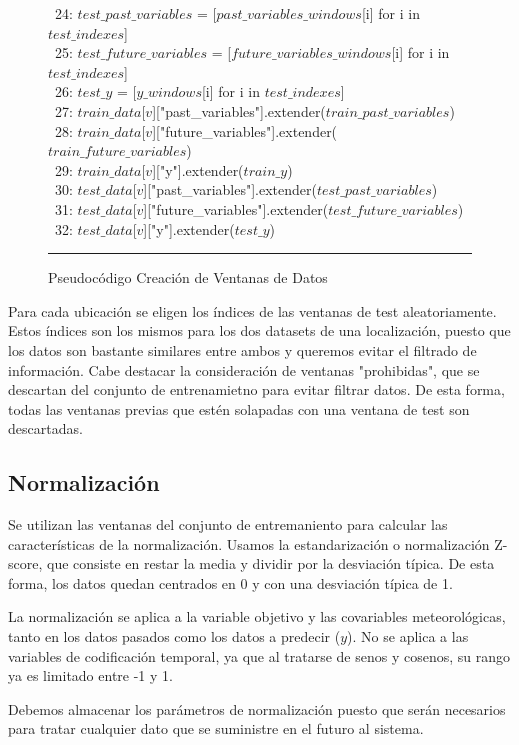 \begin{figure}[H]
{\begin{center}
\begin{tabbing}
\ 24: \> \> \> $test\_past\_variables$ = [$past\_variables\_windows$[i] for i in $test\_indexes$] \\
\ 25: \> \> \> $test\_future\_variables$ = [$future\_variables\_windows$[i] for i in $test\_indexes$] \\
\ 26: \> \> \> $test\_y$ = [$y\_windows$[i] for i in $test\_indexes$] \\
      
\ 27: \> \> \> $train\_data$[$v$]["past\_variables"].extender($train\_past\_variables$) \\
\ 28: \> \> \> $train\_data$[$v$]["future\_variables"].extender($train\_future\_variables$) \\
\ 29: \> \> \> $train\_data$[$v$][\string"y"].extender($train\_y$) \\
        
\ 30: \> \> \> $test\_data$[$v$]["past\_variables"].extender($test\_past\_variables$) \\
\ 31: \> \> \> $test\_data$[$v$]["future\_variables"].extender($test\_future\_variables$) \\
\ 32: \> \> \> $test\_data$[$v$][\string"y"].extender($test\_y$) \\

\end{tabbing}
\end{center}
\hrule
}
\caption{Pseudocódigo Creación de Ventanas de Datos}
\label{branch_and_bound_max_diversity}
\end{figure}

Para cada ubicación se eligen los índices de las ventanas de test aleatoriamente. Estos índices son los mismos para los dos datasets de una localización, 
puesto que los datos son bastante similares entre ambos y queremos evitar el filtrado de información. 
Cabe destacar la consideración de ventanas "prohibidas", que se descartan del conjunto de entrenamietno para evitar filtrar datos.
De esta forma, todas las ventanas previas que estén solapadas con una ventana de test son descartadas.

\subsection{Normalización}
Se utilizan las ventanas del conjunto de entremaniento para calcular las características de la normalización.
Usamos la estandarización o normalización Z-score, que consiste en restar la media y dividir por la desviación típica.
De esta forma, los datos quedan centrados en 0 y con una desviación típica de 1.

La normalización se aplica a la variable objetivo y las covariables meteorológicas, tanto en los datos pasados como los datos a predecir ($y$). 
No se aplica a las variables de codificación temporal, ya que al tratarse de senos y cosenos, su rango ya es limitado entre -1 y 1.

Debemos almacenar los parámetros de normalización puesto que serán necesarios para tratar cualquier dato que se suministre en el futuro al sistema.
